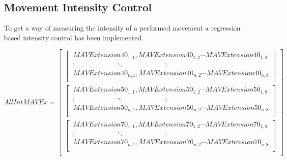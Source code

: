 
\subsection{Movement Intensity Control} \label{sub:M:regression}

To get a way of measuring the intensity of a performed movement a regression based intensity control has been implemented. 



\begin{equation} \label{eq:segMatrix}
AllIntMAVEx=\begin{bmatrix} 
\begin{bmatrix}
\ MAVExtension40_{1,1}, MAVExtension40_{1,2} \cdots MAVExtension40_{1,8} \\ 
\ \vdots \qquad \qquad \qquad \ddots \qquad \qquad \qquad \vdots \\
\ MAVExtension40_{n,1}, MAVExtension40_{n,2}  \cdots MAVExtension40_{n,8} \\ \end{bmatrix} \\
\begin{bmatrix} 
\ MAVExtension50_{1,1}, MAVExtension50_{1,2} \cdots MAVExtension50_{1,8} \\
\ \vdots \qquad \qquad \qquad \ddots \qquad \qquad \qquad \vdots \\
\ MAVExtension50_{n,1}, MAVExtension50_{n,2} \cdots MAVExtension50_{n,8} \\ \end{bmatrix} \\
\begin{bmatrix} 
\ MAVExtension70_{1,1}, MAVExtension70_{1,2} \cdots MAVExtension70_{1,8} \\
\ \vdots \qquad \qquad \qquad \ddots \qquad \qquad \qquad \vdots \\
\ MAVExtension70_{n,1}, MAVExtension70_{n,2} \cdots MAVExtension70_{n,8} \\ \end{bmatrix} \\
\end{bmatrix}
\end{equation}